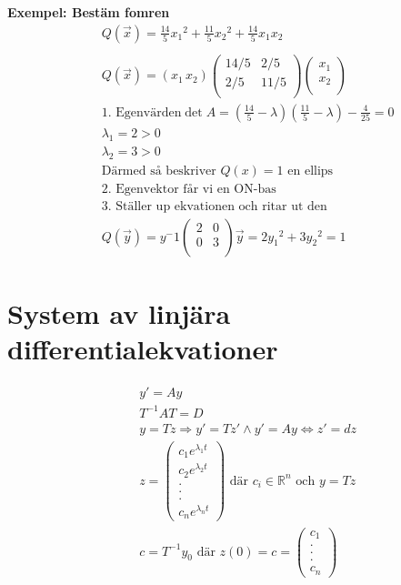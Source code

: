 \textbf{Exempel: Bestäm fomren}
\begin{align*}
  &\quad  Q(\vec{x})= \frac{14}{5}{x_1}^2 +  \frac{11}{5}{x_2}^2 + \frac{14}{5}x_1x_2  \\
  &\quad  \\
  &\quad  Q(\vec{x}) = (x_1 \, x_2 )
  \left(\begin{array}{cc}
    14/5 &  2/5  \\
     2/5 & 11/5  \\
  \end{array}\right) \begin{pmatrix} x_1 \\ x_2 \\ \end{pmatrix} \\
  &\quad  \text{1. Egenvärden} \det{A} = (\frac{14}{5} -\lambda) (\frac{11}{5} -\lambda) -\frac{4}{25} = 0 \\
  &\quad  \lambda_1 = 2 > 0 \\
  &\quad  \lambda_2 = 3 > 0 \\
  &\quad  \text{Därmed så beskriver $Q(x)=1$ en ellips} \\
  &\quad  \text{2. Egenvektor får vi en ON-bas} \\
  &\quad  \text{3. Ställer up ekvationen och ritar ut den} \\
  &\quad  Q (\vec{y}) = y^-1
  \left(\begin{array}{cc}
    2 & 0  \\
    0 & 3  \\
  \end{array}\right) \vec{y} = 2{y_1}^2 + 3{y_2}^2 = 1
\end{align*}


\newpage

\section{System av linjära differentialekvationer}
\begin{align*}
  &\quad  y'=Ay \\
  &\quad  T^{-1}AT=D \\
  &\quad  y=Tz \Rightarrow y'=Tz' \land y'=Ay \Leftrightarrow z'=dz \\
  &\quad  z=
  \begin{pmatrix} c_1e^{\lambda_1t} \\ c_2e^{\lambda_2t} \\.\\.\\.\\ c_n e^{\lambda_n t} \end{pmatrix}
  \text{ där } c_i\in\mathbb{R}^n  \text{ och } y=Tz \\
  &\quad  c = T^{-1}y_0 \text{ där } z(0) = c =
    \begin{pmatrix} c_1 \\.\\.\\.\\ c_n \end{pmatrix} 
\end{align*}

